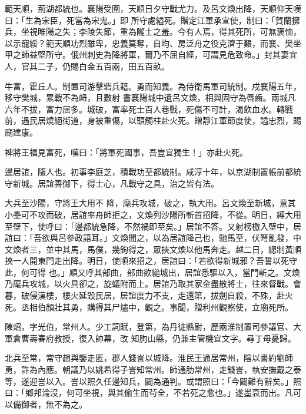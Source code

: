 \begin{pinyinscope}
 範天順，荊湖都統也。襄陽受圍，天順日夕守戰尤力。及呂文煥出降，天順仰天嘆曰：「生為宋臣，死當為宋鬼。」即
 所守處縊死。贈定江軍承宣使，制曰：「賀蘭擁兵，坐視睢陽之失；李陵失節，重為隴士之羞。今有人焉，得其死所，可無褒恤，以示寵綏？範天順功烈雖卑，忠義莫奪，自均、房泛舟之役克濟于艱，而襄、樊坐甲之師益堅所守。俄州刺史為降將軍，爾乃不屈自經，可謂見危致命。」封其妻宜人，官其二子，仍賜白金五百兩，田五百畝。



 牛富，霍丘人。制置司游擊砦兵籍。勇而知義。為侍衛馬軍司統制。戍襄陽五年，移守樊城，累戰不為衄，且數射
 書襄陽城中遺呂文煥，相與固守為唇齒。兩城凡六年不拔，富力居多。城破，富率死士百人巷戰，死傷不可計，渴飲血水。轉戰前，遇民居燒絕街道，身被重傷，以頭觸柱赴火死。贈靜江軍節度使，謚忠烈，賜廟建康。



 裨將王福見富死，嘆曰：「將軍死國事，吾豈宜獨生！」亦赴火死。



 邊居誼，隨人也。初事李庭芝，積戰功至都統制。咸淳十年，以京湖制置帳前都統守新城。居誼善御下，得士心，凡戰守之具，治之皆有法。



 大兵至沙陽，守將王大用不
 降，麾兵攻城，破之，執大用。呂文煥至新城，意其小壘可不攻而破，居誼率舟師拒之，文煥列沙陽所斬首招降，不從。明日，縛大用至壁下，使呼曰：「邊都統急降，不然禍即至矣。」居誼不答。又射榜檄入壁中，居誼曰：「吾欲與呂參政語耳。」文煥聞之，以為居誼降己也，馳馬至，伏弩亂發，中文煥者三，並中其馬，馬僕，幾鉤得之，眾挾文煥以他馬奔走。越二日，總制黃順挾一人開東門走出降。明日，使順來招之，居誼曰：「若欲得新城邪？吾誓以死守此，何可得
 也。」順又呼其部曲，部曲欲縋城出，居誼悉驅以入，當門斬之。文煥乃麾兵攻城，以火具卻之，旋蟻附而上。居誼乃取其家金盡散將士，往來督戰。會暮，破侵漢樓，樓火延毀民居，居誼度力不支，走還第，拔劍自殺，不殊，赴火死。丞相伯顏壯其勇，購得其尸燼中，觀之。事聞，贈利州觀察使，立廟死所。



 陳炤，字光伯，常州人。少工詞賦，登第，為丹徒縣尉，歷兩淮制置司參議官、大軍倉曹壽春府教授，復入帥幕，改
 知朐山縣，仍兼主管機宜文字。尋丁母憂歸。



 北兵至常，常守趙與鑒走匿，郡人錢訔以城降。淮民王通居常州，陰以書約劉師勇，許為內應。朝議乃以姚希得子訔知常州。師通肋常州，走錢訔，執安撫戴之泰等，遂迎訔以入。訔以照久任邊知兵，闢為通判。或謂照曰：「今闢難有辭矣。」照曰：「鄉邦淪沒，何可坐視，與其偷生而茍全，不若死之愈也。」遂墨衰而出。凡可以備御者，無不為之。




\end{pinyinscope}
